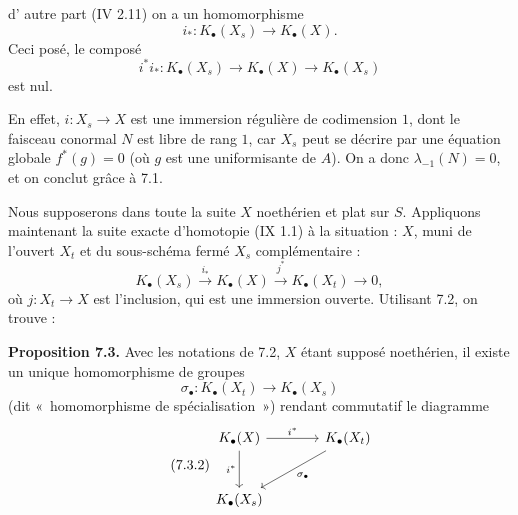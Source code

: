 d'%
autre part (IV 2.11) on a un homomorphisme
\[
 i_*:K_\bullet(X_s)\longrightarrow K_\bullet(X).
\]
Ceci posé, le composé
\[
 i^*i_*:K_\bullet(X_s)\longrightarrow K_\bullet(X)\longrightarrow K_\bullet(X_s)
\]
est nul.

En effet, \(i:X_s\to X\) est une immersion régulière de codimension \(1\), dont le faisceau conormal \(N\) est libre de rang \(1\), car \(X_s\) peut se décrire par une équation globale \(f^*(g)=0\) (où \(g\) est une uniformisante de \(A\)). On a donc \(\lambda_{-1}(N)=0\), et on conclut grâce à 7.1.

Nous supposerons dans toute la suite \(X\) noethérien et plat sur \(S\). Appliquons maintenant la suite exacte d'homotopie (IX 1.1) à la situation : \(X\), muni de l'ouvert \(X_t\) et du sous-schéma fermé \(X_s\) complémentaire :
\[
K_\bullet(X_s)\xrightarrow{i_*}K_\bullet(X)\xrightarrow{j^*}K_\bullet(X_t)\longrightarrow0,
\]
où \(j:X_t\to X\) est l'inclusion, qui est une immersion ouverte. Utilisant 7.2, on trouve :

\textbf{Proposition 7.3.} Avec les notations de 7.2, \(X\) étant supposé noethérien, il existe un unique homomorphisme de groupes
\begin{equation}\tag{7.3.1}
 \sigma_\bullet:K_\bullet(X_t)\longrightarrow K_\bullet(X_s)
\end{equation}
(dit «~homomorphisme de spécialisation~») rendant commutatif le diagramme
\begin{equation}\tag{7.3.2}
\begin{tikzcd}[column sep=large,row sep=large]
K_\bullet(X) \arrow[r,"i^*"] \arrow[d,"i^*"'] & K_\bullet(X_t) \arrow[dl,"\sigma_\bullet"]\\
K_\bullet(X_s) &
\end{tikzcd}
\end{equation}



\providecommand{\Kalg}{K_{\mathrm{alg}}}
\providecommand{\Gralg}{\operatorname{Gr}_{\mathrm{alg}}}
\providecommand{\Grnum}{\operatorname{Gr}_{\mathrm{num}}}
\providecommand{\Knum}{K_{\mathrm{num}}}
\providecommand{\Cl}{\operatorname{Cl}}
\providecommand{\Ch}{\operatorname{Ch}}
\providecommand{\Nm}{\operatorname{N}}
\providecommand{\colim}{\varinjlim}
\providecommand{\Hens}{\operatorname{Hens}}
\providecommand{\Spec}{\operatorname{Spec}}
\providecommand{\coker}{\operatorname{coker}}


